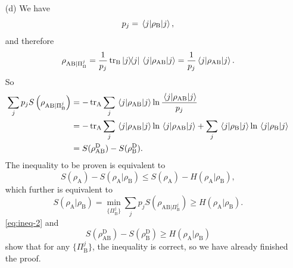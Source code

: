 \documentclass[hyperref, a4paper]{article}
\begin{document}
\begin{itemize}
\item[(d)] We have
\begin{equation}
    p_j = \expval{\rho_{\text{B}}}{j},
\end{equation}
and therefore 
\begin{equation}
    \rho_{\text{AB}|\Pi^j_{\text{B}}} = 
    \frac{1}{p_j} \trace_{\text{B}} \dyad{j} \expval{\rho_{\text{AB}}}{j}
    = \frac{1}{p_j} \expval{\rho_{\text{AB}}}{j}.
\end{equation}
So 
\begin{equation}
    \begin{aligned}
        \sum_j p_j S\left( \rho_{\text{AB}|\Pi^j_{\text{B}}} \right)
        &= - \trace_{\text{A}} \sum_j \expval{\rho_{\text{AB}}}{j} \ln \frac{\expval{\rho_{\text{AB}}}{j}}{p_j} \\
        &= - \trace_{\text{A}} \sum_{j} \expval{\rho_{\text{AB}}}{j} \ln \expval{\rho_{\text{AB}}}{j} 
        + \sum_j \expval{\rho_{\text{B}}}{j} \ln \expval{\rho_{\text{B}}}{j} \\
        &= S(\rho_{\text{AB}}^{\text{D}}) - S(\rho_{\text{B}}^{\text{D}}).
    \end{aligned}
    \label{eq:ineq-2}
\end{equation}
The inequality to be proven is equivalent to 
\[
    S(\rho_{\text{A}}) - S(\rho_{\text{A}} | \rho_{\text{B}}) \leq S(\rho_{\text{A}}) - H(\rho_{\text{A}} | \rho_{\text{B}}), 
\]
which further is equivalent to 
\begin{equation}
    S(\rho_{\text{A}} | \rho_{\text{B}}) 
    = \min_{\{\Pi^j_{\text{B}}\}} \sum_j p_j S\left( \rho_{\text{AB}|\Pi^j_{\text{B}}} \right)
    \geq H(\rho_{\text{A}} | \rho_{\text{B}}).
\end{equation}
\eqref{eq:ineq-2}  and 
\begin{equation}
    S(\rho_{\text{AB}}^{\text{D}}) - S(\rho_{\text{B}}^{\text{D}}) \geq H(\rho_{\text{A}} | \rho_{\text{B}})
\end{equation}
show that for any $\{\Pi^j_{\text{B}}\}$,
the inequality is correct,
so we have already finished the proof.


\end{itemize}
\end{document}

